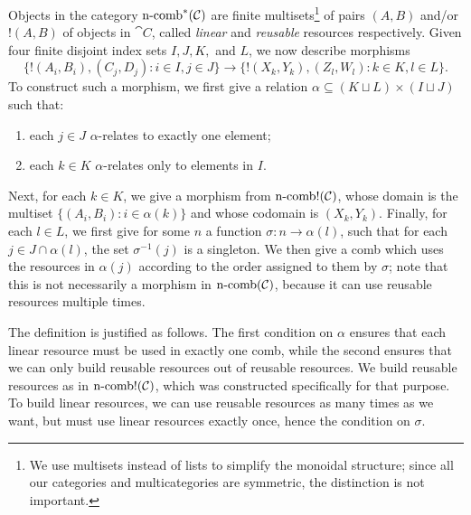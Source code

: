 \begin{dfn}\label{def:ncomba}
Objects in the category
$\operatorname*{n-comb}^*({\mathcal{C}})$ are finite multisets\footnote{
  We use multisets instead of lists to simplify the monoidal structure; since
  all our categories and multicategories are symmetric, the distinction is not
  important.
} of pairs $(A, B)$ and/or $!(A, B)$ of objects in $\cat{C}$, called
\emph{linear} and \emph{reusable} resources respectively. Given four
finite disjoint index sets $I,J,K,$ and $L$, we now describe morphisms
 \[
   \{!(A_i, B_i), (C_j, D_j): i\in I, j\in J\}\to \{!(X_k, Y_k), (Z_l, W_l):
   k\in K, l\in L\}.
\] To construct such a morphism, we first give a relation $\alpha\subseteq
(K\sqcup L)\times (I\sqcup J)$ such
that:
\begin{enumerate}
  \item each $j\in J$ $\alpha$-relates to exactly one element;
  \item each $k\in K$ $\alpha$-relates only to elements in $I$.
\end{enumerate}
Next, for each $k\in K$, we give a morphism from $\operatorname*{n-comb!}({\mathcal{C}})$, whose domain
is the multiset $\{(A_i, B_i): i\in \alpha(k)\}$ and whose codomain is $(X_k,
Y_k)$. Finally, for each $l\in L$, we first give for some $n$ a function
$\sigma: n\to \alpha(l)$, such that for each $j\in J\cap\alpha(l)$, the set
$\sigma^{-1}(j)$ is a singleton. We then give a comb which uses the resources in
$\alpha(j)$ according to the order assigned to them by $\sigma$; note that this
is not necessarily a morphism in $\operatorname*{n-comb}({\mathcal{C}})$, because it can use reusable
resources multiple times.
\end{dfn}
The definition is justified as follows. The first condition on $\alpha$ ensures
that each linear resource must be used in exactly one comb, while the second
ensures that we can only build reusable resources out of reusable resources.
We build reusable resources as in $\operatorname*{n-comb!}({\mathcal{C}})$, which was constructed
specifically for that purpose. To build linear resources, we can use
reusable resources as many times as we want, but must use linear resources
exactly once, hence the condition on $\sigma$.




